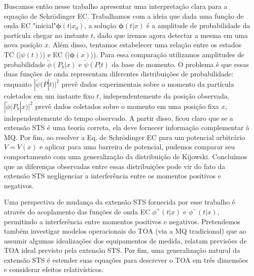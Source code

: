 Buscamos então nesse trabalho apresentar uma interpretação clara para a equação de Schrödinger EC. Trabalhamos com a ideia que dada uma função de onda EC "inicial"\text{ }$\pmb{\phi}(t|x_0)$, a solução $\pmb{\phi}(t|x)$ é a amplitude de probabilidade da partícula chegar no instante $t$, dado que iremos agora detectar a mesma em uma nova posição $x$. Além disso, tentamos estabelecer uma relação entre os estados TC ($|\psi(t) \rangle$) e EC ($|\pmb{\phi}(x)\rangle$). Para essa comparação utilizamos amplitudes de probabilidade ${\tilde \phi}(P_b|x)$ e ${\tilde \psi}(P|t)$ da base de momento. O problema é que essas duas funções de onda representam diferentes distribuições de probabilidade: enquanto $|{\tilde \psi} (P|t)|^2$ prevê dados experimentais sobre o momento da partícula coletados em um instante fixo $t$, independentemente da posição observada, $ |{\tilde \phi}(P_b|x)|^2$ prevê dados coletados sobre o momento em uma posição fixa $x$, independentemente do tempo observado. A partir disso, ficou claro que se a extensão STS é uma teoria correta, ela deve fornecer informação complementar à MQ. Por fim, ao resolver a Eq. de Schrödinger EC para um potencial arbitrário $V = V(x)$ e aplicar para uma barreira de potencial, pudemos comparar seu comportamento com uma generalização da distribuição de Kijowski. Concluímos que as diferenças observadas entre essas distribuições pode vir do fato da extensão STS negligenciar a interferência entre os momentos positivos e negativos.



Uma perspectiva de mudança da extensão STS fornecida por esse trabalho é através do acoplamento das funções de onda EC $\phi^+ (t|x)$ e $\phi^- (t|x)$, permitindo a interferência entre momentos positivos e negativos. Pretendemos também investigar modelos operacionais do TOA (via a MQ tradicional) que ao assumir algumas idealizações dos equipamentos de medida, relatam previsões de TOA ideal previsto pela extensão STS. Por fim, uma generalização natural da extensão STS é estender suas equações para descrever o TOA em três dimensões e considerar efeitos relativísticos. 












